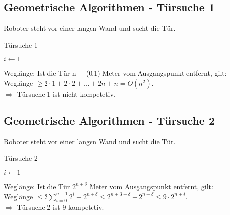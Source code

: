 \subsection{Geometrische Algorithmen - Türsuche 1}

Roboter steht vor einer langen Wand und sucht die Tür.\\


\begin{algorithm}[H]
	\caption{Türsuche 1}


	$i \leftarrow 1$
	
\end{algorithm}

Weglänge: Ist die Tür n + (0,1) Meter vom Ausgangspunkt entfernt, gilt:\\
Weglänge $\ge 2 \cdot 1 + 2 \cdot 2 + ... + 2n +n = O(n^2)$.\\
$\Rightarrow$ Türsuche 1 ist nicht kompetetiv.


\subsection{Geometrische Algorithmen - Türsuche 2}

Roboter steht vor einer langen Wand und sucht die Tür.\\


\begin{algorithm}[H]
	\caption{Türsuche 2}


	$i \leftarrow 1$
	
\end{algorithm}

Weglänge: Ist die Tür $2^{n+\delta}$ Meter vom Ausgangspunkt entfernt, gilt:\\
Weglänge $\le 2 \sum\limits_{i=0}^{n+1} 2^i + 2^{n+\delta} \le 2 ^{n+3+\delta} + 2^{n+\delta} \le 9 \cdot 2^{n+\delta}$.\\
$\Rightarrow$ Türsuche 2 ist 9-kompetetiv.


